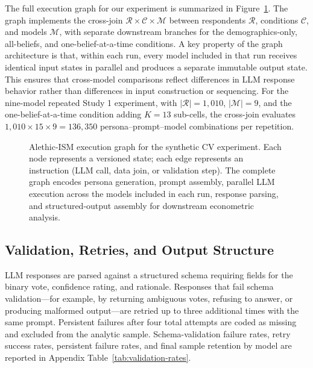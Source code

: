 \documentclass[12pt]{article}
\begin{document}
The full execution graph for our experiment is summarized in
Figure~\ref{fig:graph}. The graph implements the cross-join $\mathcal{R}
\times \mathcal{C} \times \mathcal{M}$ between respondents $\mathcal{R}$,
conditions $\mathcal{C}$, and models $\mathcal{M}$, with separate downstream
branches for the demographics-only, all-beliefs, and one-belief-at-a-time
conditions. A key property of the graph architecture is that, within each
run, every model included in that run receives identical input states in
parallel and produces a separate immutable output state. This ensures that
cross-model comparisons reflect differences in LLM response behavior rather
than differences in input construction or sequencing. For the nine-model
repeated Study 1 experiment, with $|\mathcal{R}| = 1{,}010$,
$|\mathcal{M}| = 9$, and the one-belief-at-a-time condition adding
$K = 13$ sub-cells, the cross-join evaluates
$1{,}010 \times 15 \times 9 = 136{,}350$
persona--prompt--model combinations per repetition.

\begin{figure}[h]
    \centering
    \caption{Alethic-ISM execution graph for the synthetic CV experiment.
    Each node represents a versioned state; each edge represents an
    instruction (LLM call, data join, or validation step). The complete graph encodes persona generation, prompt assembly, parallel LLM execution across the models included in each run, response parsing, and structured-output assembly for downstream econometric analysis.}
    \label{fig:graph}
\end{figure}

\subsection{Validation, Retries, and Output Structure}\label{sec:methods-validation}

LLM responses are parsed against a structured schema requiring fields for
the binary vote, confidence rating, and rationale. Responses that fail
schema validation---for example, by returning ambiguous votes, refusing
to answer, or producing malformed output---are retried up to three
additional times with the same prompt. Persistent failures after four
total attempts are coded as missing and excluded from the analytic sample.
Schema-validation failure rates, retry success rates, persistent failure
rates, and final sample retention by model are reported in Appendix
Table~\ref{tab:validation-rates}.
\end{document}
